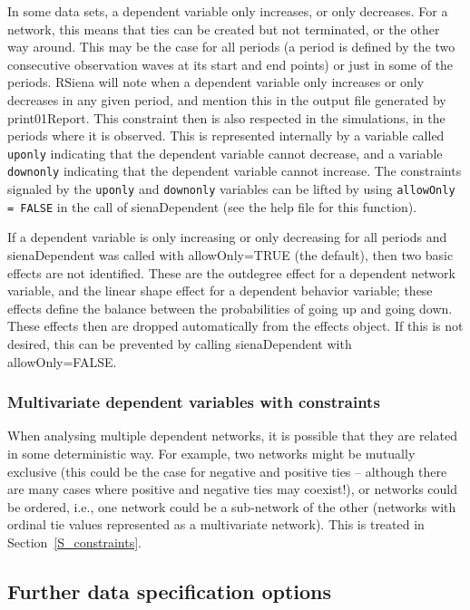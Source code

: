\documentclass[a4paper,fleqn,11pt]{article}
\newcommand{\+}{\, + \,}
\newcommand{\sfn}[1]{\textsf{#1}}
\newcommand{\RS}{{\sf RSiena }}
\begin{document}
In some data sets, a dependent variable only increases, or only decreases.
For a network, this means that ties can be created but not terminated,
or the other way around.
This may be the case for all periods (a period is defined by the
two consecutive observation waves at its start and end points)
or just in some of the periods.
\RS will note when a dependent variable only increases or only decreases
in any given period,
and mention this in the output file generated by \textsf{print01Report}.
This constraint then is also respected in the simulations, in the periods
where it is observed.
This is represented
internally by a variable called \texttt{uponly} indicating that the
dependent variable cannot decrease,
and a variable \texttt{downonly} indicating that the
dependent variable cannot increase.
The constraints signaled by the  \texttt{uponly} and  \texttt{downonly}
variables can be lifted by using \texttt{allowOnly = FALSE}
in the call of \sfn{sienaDependent} (see the help file for this function).

If a dependent variable is only increasing or only decreasing
for all periods and \sfn{sienaDependent} was called with
\sfn{allowOnly=TRUE} (the default),
then two basic effects are not identified.
These are the outdegree effect for a dependent network variable,
and the linear shape effect for a dependent behavior variable;
these effects define the balance between the probabilities of
going up and going down.
These effects then are dropped automatically from the effects object.
If this is not desired, this can be prevented
by calling \sfn{sienaDependent} with \sfn{allowOnly=FALSE}.


\subsubsection{Multivariate dependent variables with constraints}
\label{S_constraints0}

When analysing multiple dependent networks, it is possible that they
are related in some deterministic way. For example, two networks
might be mutually exclusive (this could be the case for negative and positive
ties -- although there are many cases where positive
and negative ties may coexist!), or networks could be ordered, i.e.,
one network could be a sub-network of the other
(networks with ordinal tie values represented as a multivariate network).
This is treated in Section~\ref{S_constraints}.


\subsection{Further data specification options}
\label{S_usertrans}
\end{document}
